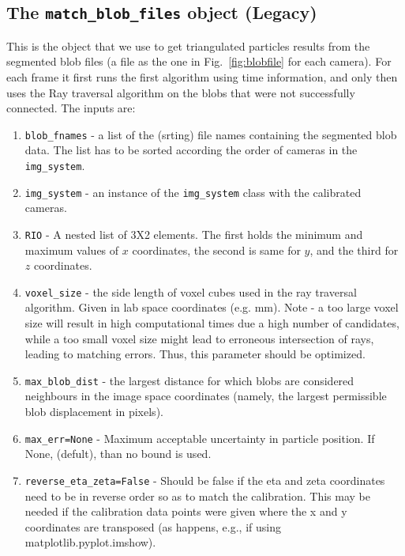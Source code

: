 \documentclass[10pt,a4paper]{article}
\begin{document}
\subsection{The \texttt{match\_blob\_files} object (Legacy)}


This is the object that we use to get triangulated particles results from the segmented blob files (a file as the one in Fig.~\ref{fig:blobfile} for each camera). For each frame it first runs the first algorithm using time information, and only then uses the Ray traversal algorithm on the blobs that were not successfully connected. The inputs are:
%
\begin{enumerate}
	\item \texttt{blob\_fnames} - a list of the (srting) file names containing the segmented blob data. The list has to be sorted according the order of cameras in the \texttt{img\_system}.
	
	\item \texttt{img\_system} - an instance of the \texttt{img\_system} class with the calibrated cameras.
	
	\item \texttt{RIO} - A nested list of 3X2 elements. The first holds the minimum and  maximum values of $x$ coordinates, the second is same for $y$, and  the third for $z$ coordinates. 
	
	\item \texttt{voxel\_size} - the side length of voxel cubes used in the ray traversal algorithm. Given in lab space coordinates (e.g. mm). Note - a too large voxel size will result in high computational times due a high number of candidates, while a too small voxel size might lead to erroneous intersection of rays, leading to matching errors. Thus, this parameter should be optimized.
	
	\item \texttt{max\_blob\_dist} - the largest distance for which blobs are considered neighbours in the image space coordinates (namely, the largest permissible blob displacement in pixels).
	
	\item \texttt{max\_err=None} - Maximum acceptable uncertainty in particle position. If None, (defult), than no bound is used.
	
	\item \texttt{reverse\_eta\_zeta=False} - Should be false if the eta and zeta coordinates need to be in reverse order so as to match the calibration. This may be needed if the calibration data points were given where the x and y coordinates are transposed (as happens, e.g., if using matplotlib.pyplot.imshow).
\end{enumerate}
\end{document}
